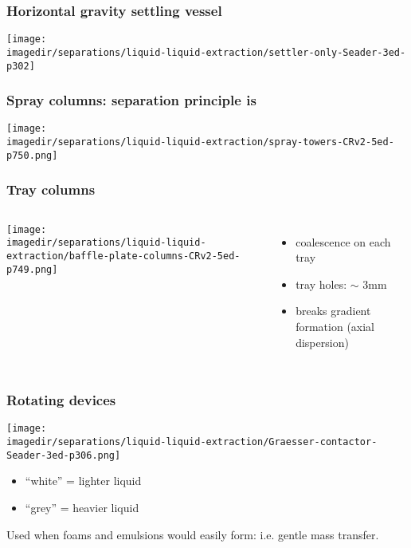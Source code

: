 \begin{frame}\frametitle{Horizontal gravity settling vessel}
	\begin{center}
		\texttt{[image: \\imagedir/separations/liquid-liquid-extraction/settler-only-Seader-3ed-p302]}
	\end{center}
\end{frame}

\begin{frame}\frametitle{Spray columns: separation principle is {\color{myRed}{gravity}}}
	\begin{center}
		\texttt{[image: \\imagedir/separations/liquid-liquid-extraction/spray-towers-CRv2-5ed-p750.png]}
	\end{center}
	\vspace{-14pt}
\end{frame}

\begin{frame}\frametitle{Tray columns}
	\begin{columns}[t]
			\vspace{-0.5cm}
			\begin{center}
				\texttt{[image: \\imagedir/separations/liquid-liquid-extraction/baffle-plate-columns-CRv2-5ed-p749.png]}
			\end{center}
			\vspace{-20pt}
			\begin{itemize}
				\item	coalescence on each tray
				\item	tray holes: $\sim$ 3mm
				\item	breaks gradient formation (axial dispersion)
			\end{itemize}
	\end{columns}
\end{frame}

\begin{frame}\frametitle{Rotating devices}
	\begin{center}
		\texttt{[image: \\imagedir/separations/liquid-liquid-extraction/Graesser-contactor-Seader-3ed-p306.png]}
	\end{center}
	\vspace{-12pt}
	\begin{itemize}
		\item	``white'' = lighter liquid
		\item	``grey'' = heavier liquid
	\end{itemize}
	Used when foams and emulsions would easily form: i.e. gentle mass transfer.
\end{frame}

